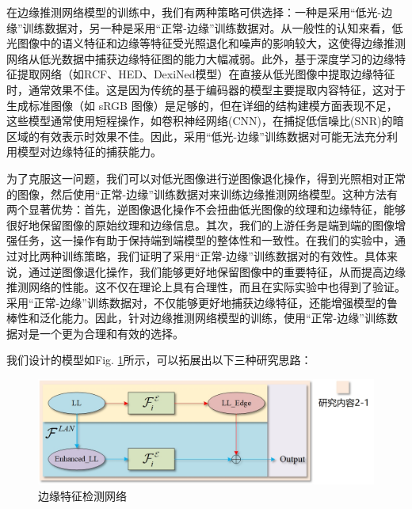 \documentclass[a4paper]{ctexart}
\begin{document}
	在边缘推测网络模型的训练中，我们有两种策略可供选择：一种是采用“低光-边缘”训练数据对，另一种是采用“正常-边缘”训练数据对。从一般性的认知来看，低光图像中的语义特征和边缘等特征受光照退化和噪声的影响较大，这使得边缘推测网络从低光数据中捕获边缘特征图的能力大幅减弱。此外，基于深度学习的边缘特征提取网络（如RCF、HED、DexiNed模型）在直接从低光图像中提取边缘特征时，通常效果不佳。这是因为传统的基于编码器的模型主要提取内容特征，这对于生成标准图像（如 sRGB 图像）是足够的，但在详细的结构建模方面表现不足，这些模型通常使用短程操作，如卷积神经网络(CNN)，在捕捉低信噪比(SNR)的暗区域的有效表示时效果不佳。因此，采用“低光-边缘”训练数据对可能无法充分利用模型对边缘特征的捕获能力。
	
	为了克服这一问题，我们可以对低光图像进行逆图像退化操作，得到光照相对正常的图像，然后使用“正常-边缘”训练数据对来训练边缘推测网络模型。这种方法有两个显著优势：首先，逆图像退化操作不会扭曲低光图像的纹理和边缘特征，能够很好地保留图像的原始纹理和边缘信息。其次，我们的上游任务是端到端的图像增强任务，这一操作有助于保持端到端模型的整体性和一致性。在我们的实验中，通过对比两种训练策略，我们证明了采用“正常-边缘”训练数据对的有效性。具体来说，通过逆图像退化操作，我们能够更好地保留图像中的重要特征，从而提高边缘推测网络的性能。这不仅在理论上具有合理性，而且在实际实验中也得到了验证。采用“正常-边缘”训练数据对，不仅能够更好地捕获边缘特征，还能增强模型的鲁棒性和泛化能力。因此，针对边缘推测网络模型的训练，使用“正常-边缘”训练数据对是一个更为合理和有效的选择。
	
	我们设计的模型如Fig. \ref{fig: DCMP}所示，可以拓展出以下三种研究思路：
	
	\begin{figure}[htbp]
		\centering
		\includegraphics[width=0.5\linewidth]{picture/Edge Detection/DCMP}
		\caption{边缘特征检测网络}
		\label{fig: DCMP}
	\end{figure}
	
\end{document}
